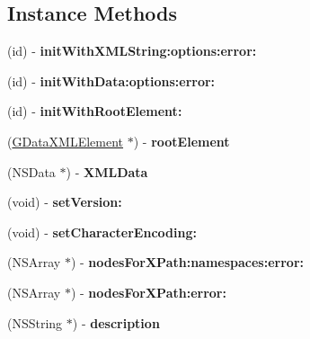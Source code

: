 \subsection*{Instance Methods}
\begin{DoxyCompactItemize}
\item 
\hypertarget{interface_g_data_x_m_l_document_affa6920d0dfcedcd5bc0e21e74af971d}{(id) -\/ {\bfseries init\+With\+X\+M\+L\+String\+:options\+:error\+:}}\label{interface_g_data_x_m_l_document_affa6920d0dfcedcd5bc0e21e74af971d}

\item 
\hypertarget{interface_g_data_x_m_l_document_a5aac20d1849c77ca0904fdd50e65491a}{(id) -\/ {\bfseries init\+With\+Data\+:options\+:error\+:}}\label{interface_g_data_x_m_l_document_a5aac20d1849c77ca0904fdd50e65491a}

\item 
\hypertarget{interface_g_data_x_m_l_document_ab91990967e0e050dfe889f9b67b0d4db}{(id) -\/ {\bfseries init\+With\+Root\+Element\+:}}\label{interface_g_data_x_m_l_document_ab91990967e0e050dfe889f9b67b0d4db}

\item 
\hypertarget{interface_g_data_x_m_l_document_af6e96fd6b07f84044facaf26706f6497}{(\hyperlink{interface_g_data_x_m_l_element}{G\+Data\+X\+M\+L\+Element} $\ast$) -\/ {\bfseries root\+Element}}\label{interface_g_data_x_m_l_document_af6e96fd6b07f84044facaf26706f6497}

\item 
\hypertarget{interface_g_data_x_m_l_document_a984d2f49915376794041612b8c7b0534}{(N\+S\+Data $\ast$) -\/ {\bfseries X\+M\+L\+Data}}\label{interface_g_data_x_m_l_document_a984d2f49915376794041612b8c7b0534}

\item 
\hypertarget{interface_g_data_x_m_l_document_ac43d5fecaa5ca156d4a2202604f63098}{(void) -\/ {\bfseries set\+Version\+:}}\label{interface_g_data_x_m_l_document_ac43d5fecaa5ca156d4a2202604f63098}

\item 
\hypertarget{interface_g_data_x_m_l_document_a4c38b4821cf2fd94e0be91e5f58c47c5}{(void) -\/ {\bfseries set\+Character\+Encoding\+:}}\label{interface_g_data_x_m_l_document_a4c38b4821cf2fd94e0be91e5f58c47c5}

\item 
\hypertarget{interface_g_data_x_m_l_document_a8f72a4eb0c1d63deb9cf99ec44459cc4}{(N\+S\+Array $\ast$) -\/ {\bfseries nodes\+For\+X\+Path\+:namespaces\+:error\+:}}\label{interface_g_data_x_m_l_document_a8f72a4eb0c1d63deb9cf99ec44459cc4}

\item 
\hypertarget{interface_g_data_x_m_l_document_aa354334c070410bde942b706ce83e190}{(N\+S\+Array $\ast$) -\/ {\bfseries nodes\+For\+X\+Path\+:error\+:}}\label{interface_g_data_x_m_l_document_aa354334c070410bde942b706ce83e190}

\item 
\hypertarget{interface_g_data_x_m_l_document_a9bc2a02ba6251d9670127923b43df1a9}{(N\+S\+String $\ast$) -\/ {\bfseries description}}\label{interface_g_data_x_m_l_document_a9bc2a02ba6251d9670127923b43df1a9}

\end{DoxyCompactItemize}
